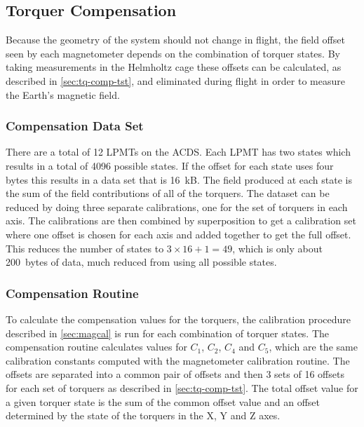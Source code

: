 \subsection{Torquer Compensation}

Because the geometry of the system should not change in flight, the field offset seen by each magnetometer depends on the combination of torquer states. By taking measurements in the Helmholtz cage these offsets can be calculated, as described in \cref{sec:tq-comp-tst}, and eliminated during flight in order to measure the Earth's magnetic field.

\subsubsection{Compensation Data Set}

\label{sec:comp-dat-set}

There are a total of 12 \acp{LPMT} on the \ac{ACDS}. Each \ac{LPMT} has two states which results in a total of 4096 possible states. If the offset for each state uses four bytes this results in a data set that is 16~kB. The field produced at each state is the sum of the field contributions of all of the torquers. The dataset can be reduced by doing three separate calibrations, one for the set of torquers in each axis. The calibrations are then combined by superposition to get a calibration set where one offset is chosen for each axis and added together to get the full offset. This reduces the number of states to $3 \times 16 + 1 = 49$, which is only about 200~bytes of data, much reduced from using all possible states.

\subsubsection{Compensation Routine}

\label{sec:tq-comp}

To calculate the compensation values for the torquers, the calibration procedure described in \cref{sec:magcal} is run for each combination of torquer states. The compensation routine calculates values for $C_1$, $C_2$, $C_4$ and $ C_5$, which are the same calibration constants computed with the magnetometer calibration routine. The offsets are separated into a common pair of offsets and then 3 sets of 16 offsets for each set of torquers as described in \cref{sec:tq-comp-tst}. The total offset value for a given torquer state is the sum of the common offset value and an offset determined by the state of the torquers in the X, Y and Z axes.

